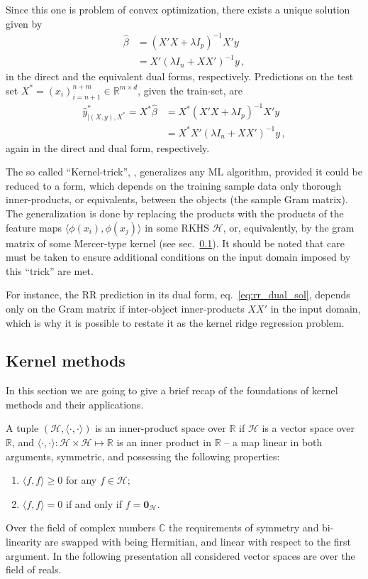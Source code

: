\documentclass[a4paper,14pt]{extarticle}
\newcommand{\Hcal}{\mathcal{H}}
\newcommand{\Real}{\mathbb{R}}
\newcommand{\nil}{\mathbf{0}}
\newcommand{\Cplx}{\mathbb{C}}
\begin{document}
Since this one is problem of convex optimization, there exists a unique solution
given by 
\begin{align*}
  \hat{\beta}
    &= (X'X + \lambda I_p)^{-1} X' y \\
    &= X' (\lambda I_n + XX')^{-1} y \,,
\end{align*}
in the direct and the equivalent dual forms, respectively. Predictions on the test
set $X^* = (x_i)_{i=n+1}^{n+m}\in \Real^{m\times d}$, given the train-set, are
\begin{align}
  \hat{y}^*_{\vert(X,y), X^*} = X^* \hat{\beta}
    &= X^* (X'X + \lambda I_p)^{-1} X' y \nonumber \\ 
    &= X^* X' (\lambda I_n + XX')^{-1} y \label{eq:rr_dual_sol}\,,
\end{align}
again in the direct and dual form, respectively.

The so called ``Kernel-trick'', \cite{scholkopf2002}, generalizes any ML algorithm,
provided it could be reduced to a form, which depends on the training sample data
only thorough inner-products, or equivalents, between the objects (the sample Gram
matrix). The generalization is done by replacing the products with the products of
the feature maps $\langle\phi(x_i),\phi(x_j)\rangle$ in some RKHS $\Hcal$, or, equivalently,
by the gram matrix of some Mercer-type kernel (see sec.~\ref{sub:kernel_methods}).
It should be noted that care must be taken to ensure additional conditions on the
input domain imposed by this ``trick'' are met.

For instance, the RR prediction in its dual form, eq.~\ref{eq:rr_dual_sol}, depends
only on the Gram matrix if inter-object inner-products $X X'$ in the input domain,
which is why it is possible to restate it as the kernel ridge regression problem.

\subsection{Kernel methods} %
\label{sub:kernel_methods}

In this section we are going to give a brief recap of the foundations of kernel methods
and their applications.

A tuple $(\Hcal, \langle\cdot, \cdot\rangle)$ is an inner-product space over $\Real$
if $\Hcal$ is a vector space over $\Real$, and $\langle\cdot, \cdot\rangle : \Hcal
\times \Hcal \mapsto \Real$ is an inner product in $\Real$ -- a map linear in both
arguments, symmetric, and possessing the following properties:
\begin{enumerate}
  \item $\langle f, f\rangle\geq 0$ for any $f\in \Hcal$;
  \item $\langle f, f\rangle = 0$ if and only if $f = \nil_\Hcal$.
\end{enumerate}
Over the field of complex numbers $\Cplx$ the requirements of symmetry and bi-
linearity are swapped with being Hermitian, and linear with respect to the first
argument. In the following presentation all considered vector spaces are over the
field of reals.
\end{document}
